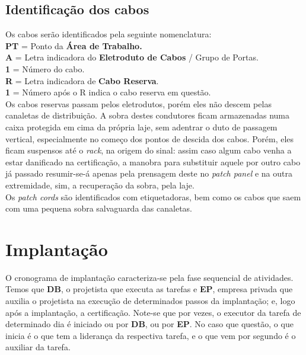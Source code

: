 \documentclass[	DIV=calc,%
							paper=a4,%
							fontsize=12pt,%
							onecolumn]{scrartcl}	 					%
\begin{document}
\clearpage

\recalctypearea

{\centering

}

\clearpage
{}
\recalctypearea

\subsection{Identificação dos cabos}

Os cabos serão identificados pela seguinte nomenclatura:
\\

\textbf{PT} = Ponto da \textbf{Área de Trabalho.}
\\

\textbf{A} = Letra indicadora do \textbf{Eletroduto de Cabos} / Grupo de Portas.
\\

\textbf{1} = Número do cabo.
\\

\textbf{R} = Letra indicadora de \textbf{Cabo Reserva}.
\\

\textbf{1} = Número após o R indica o cabo reserva em questão.
\\

Os cabos reservas passam pelos eletrodutos, porém eles não descem pelas canaletas de distribuição. A sobra destes condutores ficam armazenadas numa caixa protegida em cima da própria laje, sem adentrar o duto de passagem vertical, especialmente no começo dos pontos de descida dos cabos. Porém, eles ficam suspensos até o \textit{rack}, na origem do sinal: assim caso algum cabo venha a estar danificado na certificação, a manobra para substituir aquele por outro cabo já passado resumir-se-á apenas pela prensagem deste no \textit{patch panel} e na outra extremidade, sim, a recuperação da sobra, pela laje.
\\

Os \textit{patch cords} são identificados com etiquetadoras, bem como os cabos que saem com uma pequena sobra salvaguarda das canaletas.

\section{Implantação}

O cronograma de implantação caracteriza-se pela fase sequencial de atividades. Temos que \textbf{DB}, o projetista que executa as tarefas e \textbf{EP}, empresa privada que auxilia o projetista na execução de determinados passos da implantação; e, logo após a implantação, a certificação. Note-se que por vezes, o executor da tarefa de determinado dia é iniciado ou por \textbf{DB}, ou por \textbf{EP}. No caso que questão, o que inicia é o que tem a liderança da respectiva tarefa, e o que vem por segundo é o auxiliar da tarefa.
\\
\end{document}
